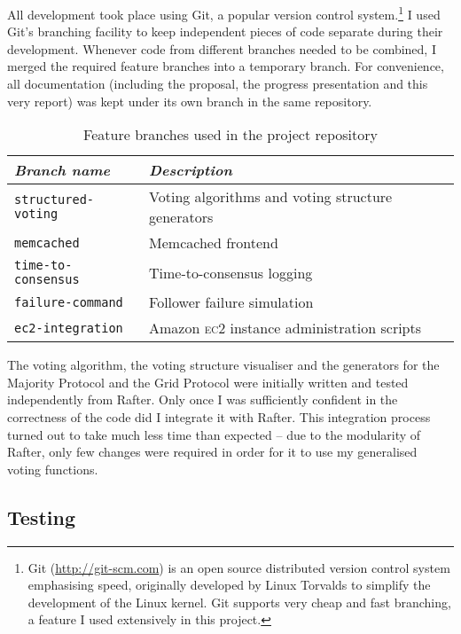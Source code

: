 \documentclass[11pt,chapterprefix=true,toc=bibliography,numbers=noendperiod,
               footnotes=multiple,twoside]{scrreprt}
\newcommand{\ECC}[0]{\textsc{ec}2 }
\begin{document}
All development took place using Git, a popular version control system.\footnote{Git (\url{http://git-scm.com}) is an open source distributed version control system emphasising speed, originally developed by Linux Torvalds to simplify the development of the Linux kernel. Git supports very cheap and fast branching, a feature I used extensively in this project.} I used Git's branching facility to keep independent pieces of code separate during their development. Whenever code from different branches needed to be combined, I merged the required feature branches into a temporary branch. For convenience, all documentation (including the proposal, the progress presentation and this very report) was kept under its own branch in the same repository.

\begin{table}[h]
    \centering
    \begin{tabularx}{\textwidth}{l X}
        \toprule
        \textit{Branch name} & \textit{Description} \\
        \midrule
        \texttt{structured-voting} & Voting algorithms and voting structure generators \\
        \texttt{memcached} & Memcached frontend \\
        \texttt{time-to-consensus} & Time-to-consensus logging \\
        \texttt{failure-command} & Follower failure simulation \\
        \texttt{ec2-integration} & Amazon \ECC instance administration scripts \\
        \bottomrule
    \end{tabularx}
    \caption{Feature branches used in the project repository}
    \label{tab:branches}
\end{table}

The voting algorithm, the voting structure visualiser and the generators for the Majority Protocol and the Grid Protocol were initially written and tested independently from Rafter. Only once I was sufficiently confident in the correctness of the code did I integrate it with Rafter. This integration process turned out to take much less time than expected -- due to the modularity of Rafter, only few changes were required in order for it to use my generalised voting functions.

\subsection{Testing}
\end{document}
